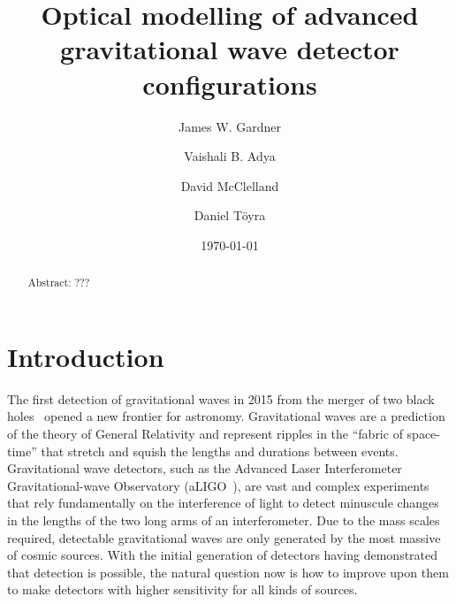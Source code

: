 \documentclass[aps,pra,superscriptaddress,reprint,nofootinbib]{revtex4-1}
\begin{document}
\title{Optical modelling of advanced gravitational wave detector configurations}

\author{James W. Gardner}
%

\author{Vaishali B. Adya}

\author{David McClelland}

\author{Daniel Töyra}

\date{\today}


\begin{abstract}
Abstract: ??? 

\end{abstract}

\maketitle

\section{Introduction}
\label{sec:introduction}

The first detection of gravitational waves in 2015 from the merger of two black holes~\cite{GW150914} opened a new frontier for astronomy. 
Gravitational waves are a prediction of the theory of General Relativity and represent ripples in the ``fabric of space-time'' that stretch and squish the lengths and durations between events. Gravitational wave detectors, such as the Advanced Laser Interferometer Gravitational-wave Observatory (aLIGO~\cite{AdvancedLIGO:2015}), are vast and complex experiments that rely fundamentally on the interference of light to detect minuscule changes in the lengths of the two long arms of an interferometer. Due to the mass scales required, detectable gravitational waves are only generated by the most massive of cosmic sources. With the initial generation of detectors having demonstrated that detection is possible, the natural question now is how to improve upon them to make detectors with higher sensitivity for all kinds of sources.
\end{document}
